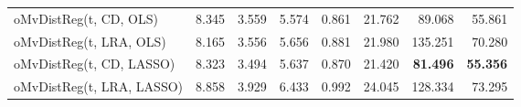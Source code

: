 \begin{tabular}{lrrrrrrr}
oMvDistReg(t, CD, OLS) & {\cellcolor[HTML]{F9BC39}} \color[HTML]{000000} 8.345 & {\cellcolor[HTML]{3FF68A}} \color[HTML]{000000} 3.559 & {\cellcolor[HTML]{434EBA}} \color[HTML]{F1F1F1} 5.574 & {\cellcolor[HTML]{4040A2}} \color[HTML]{F1F1F1} 0.861 & {\cellcolor[HTML]{46F884}} \color[HTML]{000000} 21.762 & {\cellcolor[HTML]{4771E9}} \color[HTML]{F1F1F1} 89.068 & {\cellcolor[HTML]{351E58}} \color[HTML]{F1F1F1} 55.861 \\
oMvDistReg(t, LRA, OLS) & {\cellcolor[HTML]{BEF434}} \color[HTML]{000000} 8.165 & {\cellcolor[HTML]{38F491}} \color[HTML]{000000} 3.556 & {\cellcolor[HTML]{4687FB}} \color[HTML]{F1F1F1} 5.656 & {\cellcolor[HTML]{4391FE}} \color[HTML]{F1F1F1} 0.881 & {\cellcolor[HTML]{7DFF56}} \color[HTML]{000000} 21.980 & {\cellcolor[HTML]{A11201}} \color[HTML]{F1F1F1} 135.251 & {\cellcolor[HTML]{D2E935}} \color[HTML]{000000} 70.280 \\
oMvDistReg(t, CD, LASSO) & {\cellcolor[HTML]{F5C53A}} \color[HTML]{000000} 8.323 & {\cellcolor[HTML]{1CCDD8}} \color[HTML]{000000} 3.494 & {\cellcolor[HTML]{477BF2}} \color[HTML]{F1F1F1} 5.637 & {\cellcolor[HTML]{4664DA}} \color[HTML]{F1F1F1} 0.870 & {\cellcolor[HTML]{18DBC5}} \color[HTML]{000000} 21.420 & {\cellcolor[HTML]{30123B}} \color[HTML]{F1F1F1} \bfseries 81.496 & {\cellcolor[HTML]{30123B}} \color[HTML]{F1F1F1} \bfseries 55.356 \\
oMvDistReg(t, LRA, LASSO) & {\cellcolor[HTML]{7A0403}} \color[HTML]{F1F1F1} 8.858 & {\cellcolor[HTML]{7A0403}} \color[HTML]{F1F1F1} 3.929 & {\cellcolor[HTML]{7A0403}} \color[HTML]{F1F1F1} 6.433 & {\cellcolor[HTML]{DD3D08}} \color[HTML]{F1F1F1} 0.992 & {\cellcolor[HTML]{7A0403}} \color[HTML]{F1F1F1} 24.045 & {\cellcolor[HTML]{E5470B}} \color[HTML]{F1F1F1} 128.334 & {\cellcolor[HTML]{FDAE35}} \color[HTML]{000000} 73.295 \\
\bottomrule
\end{tabular}
